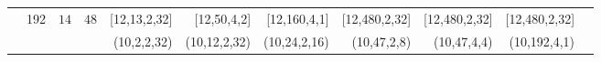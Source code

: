 \begin{table}[]
\begin{threeparttable}
\begin{tabular}{lrrrrrrrrrr }
\rowcolor{Gray}\multirow{-2}{*}{\textbf{CONV9}} &\multirow{-2}{*}{192}&\multirow{-2}{*}{$14$} & \multirow{-2}{*}{$48$}&[12,\hspace{1em}13,\hspace{0.5em}2,\hspace{0.5em}32] &[12,\hspace{1em}50,\hspace{0.5em}4,\hspace{0.5em}\hspace{0.5em}2] &[12,\hspace{0.5em}160,\hspace{0.5em}4,\hspace{0.5em}\hspace{0.5em}1] &[12,\hspace{0.5em}480,\hspace{0.5em}2,\hspace{0.5em}32] &[12,\hspace{0.5em}480,\hspace{0.5em}2,\hspace{0.5em}32] &[12,\hspace{0.5em}480,\hspace{0.5em}2,\hspace{0.5em}32] \\
& & & &(10,\hspace{1.5em}2,\hspace{0.5em}2,\hspace{0.5em}32) &(10,\hspace{1em}12,\hspace{0.5em}2,\hspace{0.5em}32) &(10,\hspace{1em}24,\hspace{0.5em}2,\hspace{0.5em}16) &(10,\hspace{1em}47,\hspace{0.5em}2,\hspace{0.5em}\hspace{0.5em}8) &(10,\hspace{1em}47,\hspace{0.5em}4,\hspace{0.5em}\hspace{0.5em}4) &(10,\hspace{0.5em}192,\hspace{0.5em}4,\hspace{0.5em}\hspace{0.5em}1) \\

\end{tabular}
\end{threeparttable}
\end{table}

